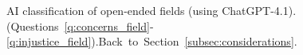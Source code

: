 \begin{figure}[h!]
    \caption[AI classification of open-ended fields]{AI classification of open-ended fields (using ChatGPT-4.1). (Questions~\ref{q:concerns_field}-\ref{q:injustice_field}).\hfill Back~to~Section~\ref{subsec:considerations}.
    }\label{fig:field_gpt}
\end{figure}

